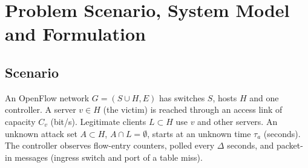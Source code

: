 \documentclass[conference]{IEEEtran}
\begin{document}
\section{Problem Scenario, System Model and Formulation}\label{sec:model}
\subsection{Scenario}
An OpenFlow network $G=(S\cup H,E)$ has switches $S$, hosts $H$ and one controller. A server $v\in H$ (the victim) is reached through an access link of capacity $C_v$ (bit/s). Legitimate clients $L\subset H$ use $v$ and other servers. An unknown attack set $A\subset H$, $A\cap L=\emptyset$, starts at an unknown time $\tau_a$ (seconds). The controller observes flow-entry counters, polled every $\Delta$ seconds, and packet-in messages (ingress switch and port of a table miss).
\end{document}
